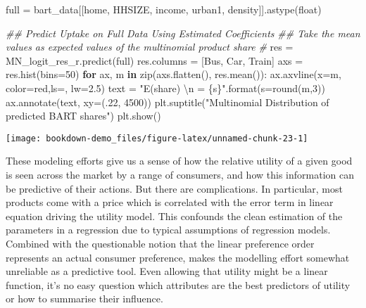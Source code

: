 \documentclass[]{tufte-book}
\newenvironment{Shaded}{}{}
\newcommand{\BuiltInTok}[1]{#1}
\newcommand{\CharTok}[1]{\textcolor[rgb]{0.25,0.44,0.63}{#1}}
\newcommand{\CommentTok}[1]{\textcolor[rgb]{0.38,0.63,0.69}{\textit{#1}}}
\newcommand{\ControlFlowTok}[1]{\textcolor[rgb]{0.00,0.44,0.13}{\textbf{#1}}}
\newcommand{\DecValTok}[1]{\textcolor[rgb]{0.25,0.63,0.44}{#1}}
\newcommand{\FloatTok}[1]{\textcolor[rgb]{0.25,0.63,0.44}{#1}}
\newcommand{\KeywordTok}[1]{\textcolor[rgb]{0.00,0.44,0.13}{\textbf{#1}}}
\newcommand{\NormalTok}[1]{#1}
\newcommand{\OperatorTok}[1]{\textcolor[rgb]{0.40,0.40,0.40}{#1}}
\newcommand{\SpecialCharTok}[1]{\textcolor[rgb]{0.25,0.44,0.63}{#1}}
\newcommand{\StringTok}[1]{\textcolor[rgb]{0.25,0.44,0.63}{#1}}
\theoremstyle{definition}
\theoremstyle{definition}
\theoremstyle{definition}
\theoremstyle{remark}
\begin{document}
\begin{Shaded}
\begin{Highlighting}[]
\NormalTok{full }\OperatorTok{=}\NormalTok{ bart\_data[[}\StringTok{\textquotesingle{}home\textquotesingle{}}\NormalTok{, }\StringTok{\textquotesingle{}HHSIZE\textquotesingle{}}\NormalTok{, }\StringTok{\textquotesingle{}income\textquotesingle{}}\NormalTok{, }\StringTok{\textquotesingle{}urban1\textquotesingle{}}\NormalTok{, }\StringTok{\textquotesingle{}density\textquotesingle{}}\NormalTok{]].astype(}\BuiltInTok{float}\NormalTok{)}

\CommentTok{\#\# Predict Uptake on Full Data Using Estimated Coefficients}
\CommentTok{\#\# Take the mean values as expected values of the multinomial product share}
\CommentTok{\#}
\NormalTok{res }\OperatorTok{=}\NormalTok{ MN\_logit\_res\_r.predict(full)}
\NormalTok{res.columns }\OperatorTok{=}\NormalTok{ [}\StringTok{\textquotesingle{}Bus\textquotesingle{}}\NormalTok{, }\StringTok{\textquotesingle{}Car\textquotesingle{}}\NormalTok{, }\StringTok{\textquotesingle{}Train\textquotesingle{}}\NormalTok{]}
\NormalTok{axs }\OperatorTok{=}\NormalTok{ res.hist(bins}\OperatorTok{=}\DecValTok{50}\NormalTok{)}
\ControlFlowTok{for}\NormalTok{ ax, m }\KeywordTok{in} \BuiltInTok{zip}\NormalTok{(axs.flatten(), res.mean()):}
\NormalTok{  ax.axvline(x}\OperatorTok{=}\NormalTok{m, color}\OperatorTok{=}\StringTok{\textquotesingle{}red\textquotesingle{}}\NormalTok{,ls}\OperatorTok{=}\StringTok{\textquotesingle{}{-}{-}\textquotesingle{}}\NormalTok{, lw}\OperatorTok{=}\FloatTok{2.5}\NormalTok{)}
\NormalTok{  text }\OperatorTok{=} \StringTok{"E(share) }\CharTok{\textbackslash{}n}\StringTok{ = }\SpecialCharTok{\{s\}}\StringTok{"}\NormalTok{.}\BuiltInTok{format}\NormalTok{(s}\OperatorTok{=}\BuiltInTok{round}\NormalTok{(m,}\DecValTok{3}\NormalTok{))}
\NormalTok{  ax.annotate(text, xy}\OperatorTok{=}\NormalTok{(}\FloatTok{.22}\NormalTok{, }\DecValTok{4500}\NormalTok{))}
\NormalTok{plt.suptitle(}\StringTok{"Multinomial Distribution of predicted BART shares"}\NormalTok{)}
\NormalTok{plt.show()}
\end{Highlighting}
\end{Shaded}

\texttt{[image: bookdown-demo\_files/figure-latex/unnamed-chunk-23-1]}

These modeling efforts give us a sense of how the relative utility of a given good is seen across the market by a range of consumers, and how this information can be predictive of their actions. But there are complications. In particular, most products come with a price which is correlated with the error term in linear equation driving the utility model. This confounds the clean estimation of the parameters in a regression due to typical assumptions of regression models. Combined with the questionable notion that the linear preference order represents an actual consumer preference, makes the modelling effort somewhat unreliable as a predictive tool. Even allowing that utility might be a linear function, it's no easy question which attributes are the best predictors of utility or how to summarise their influence.
\end{document}
